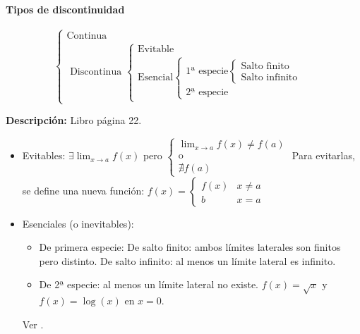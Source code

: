 \paragraph{Tipos de discontinuidad}

\[
\begin{cases} 
	\text{Continua}\\
	\text{ Discontinua }
		\begin{cases}
			\text{Evitable}\\
			\text{Esencial}
				\begin{cases}
					\text{1ª especie}
						\begin{cases}
							\text{Salto finito}\\
							\text{Salto infinito}
						\end{cases}\\
					\text{2ª especie}
				\end{cases}
		\end{cases}
\end{cases}
\]

\textbf{Descripción: } Libro página 22. 
\begin{itemize}
	\item Evitables: $\exists \displaystyle\lim_{x\to a}f(x)$ pero $\begin{cases}\displaystyle\lim_{x\to a}f(x) \neq f(a)\\\text{o}\\\nexists f(a)\end{cases}$
	\subitem Para evitarlas, se define una nueva función: $f(x) = \begin{cases}f(x) & x\neq a\\ b & x=a \end{cases}$
	\item Esenciales (o inevitables): 
	\begin{itemize}
		\item De primera especie:
		\subitem De salto finito: ambos límites laterales son finitos pero distinto.
		\subitem De salto infinito: al menos un límite lateral es infinito.
		\item De 2ª especie: al menos un límite lateral no existe. $f(x) = \sqrt{x}$ y $f(x) = \log(x)$ en $x=0$.
	\end{itemize}
\obs Ver .
\end{itemize}


